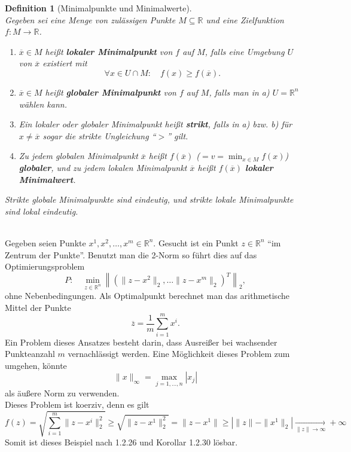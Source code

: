 \documentclass[12pt]{extreport} %
\newcommand{\R}{\mathbb{R}}
\theoremstyle{named}
\theoremstyle{nnamed}
\theoremstyle{itshape}
\newtheorem*{definition}{Definition}
\theoremstyle{normal}
\begin{document}
\begin{definition}[Minimalpunkte und Minimalwerte] ~\\
	Gegeben sei eine Menge von zulässigen Punkte $M \subseteq \R$ und eine Zielfunktion $f \colon M \rightarrow \R$.
	\begin{enumerate}
		\item $\overline{x} \in M$ heißt \textbf{lokaler Minimalpunkt} von $f$ auf $M$, falls eine Umgebung $U$ von $\overline{x}$  existiert mit
			$$ \forall x \in U \cap M: \quad f(x) \geq f(\overline{x}). $$
		\item $\overline{x} \in M$ heißt \textbf{globaler Minimalpunkt} von $f$ auf $M$, falls man in a) $U = \R^n$ wählen kann.
		\item Ein lokaler oder globaler Minimalpunkt heißt \textbf{strikt}, falls in a) bzw. b) für $x \neq \overline{x}$ sogar die strikte Ungleichung \enquote{$>$} gilt.
		\item Zu jedem globalen Minimalpunkt $\overline{x}$ heißt $f(\overline{x})$ ($= v = \min_{x \in M} f(x)$) \textbf{globaler}, und zu jedem lokalen Minimalpunkt $\overline{x}$ heißt $f(\overline{x})$ \textbf{lokaler Minimalwert}.
	\end{enumerate}
	Strikte globale Minimalpunkte sind eindeutig, und strikte lokale Minimalpunkte sind lokal eindeutig.
\end{definition}

\begin{beispiel} ~\\
	Gegeben seien Punkte $x^1, x^2, \dotsc, x^m \in \R^n$. Gesucht ist ein Punkt $z \in \R^n$ \enquote{im Zentrum der Punkte}. Benutzt man die 2-Norm so führt dies auf das Optimierungsproblem
		$$ P: \quad \min_{z \in \R^n} \left\| \left( \| z - x^2 \|_2, \dotsc \| z - x^m \|_2 \right)^T \right\|_2, $$
	ohne Nebenbedingungen. Als Optimalpunkt berechnet man das arithmetische Mittel der Punkte
	$$ \overline{z} = \frac{1}{m} \sum_{i=1}^m x^i. $$
	Ein Problem dieses Ansatzes besteht darin, dass Ausreißer bei wachsender Punkteanzahl $m$ vernachlässigt werden. Eine Möglichkeit dieses Problem zum umgehen, könnte 
	$$ \| x \|_\infty = \max_{j=1, \dotsc, n} |x_j| $$ 
	als äußere Norm zu verwenden. ~\\
	
	Dieses Problem ist koerziv, denn es gilt
	$$ f(z) = \sqrt{\sum_{i=1}^m \| z - x^i \|_2^2} \geq \sqrt{\| z - x^1 \|_2^2} = \| z - x^1 \| \geq \left| \| z \| - \| x^1 \|_2 \right| \xrightarrow[\| z\|\rightarrow \infty]{} +\infty $$
	Somit ist dieses Beispiel nach 1.2.26 und Korollar 1.2.30 lösbar.
\end{beispiel}
\end{document}

